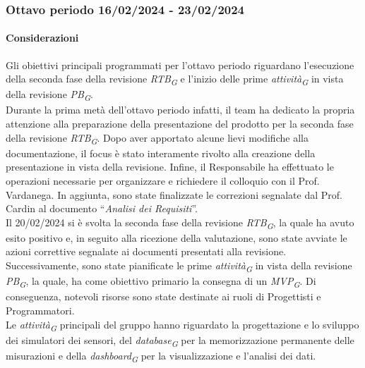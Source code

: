 
\subsubsection{Ottavo periodo  16/02/2024 - 23/02/2024}
\paragraph{Considerazioni}

Gli obiettivi principali programmati per l’ottavo periodo riguardano l’esecuzione della seconda fase della revisione \textit{RTB}\textsubscript{\textit{G}} e l’inizio delle prime \textit{attività}\textsubscript{\textit{G}} in vista della revisione \textit{PB}\textsubscript{\textit{G}}. \\
Durante la prima metà dell’ottavo periodo infatti, il team ha dedicato la propria attenzione alla preparazione della presentazione del prodotto per la seconda fase della revisione \textit{RTB}\textsubscript{\textit{G}}. Dopo aver apportato alcune lievi modifiche alla documentazione, il focus è stato interamente rivolto alla creazione della presentazione in vista della revisione. Infine, il Responsabile ha effettuato le operazioni necessarie per organizzare e richiedere il colloquio con il Prof. Vardanega. In aggiunta, sono state finalizzate le correzioni segnalate dal Prof. Cardin al documento “\textit{Analisi dei Requisiti}”. \\
Il 20/02/2024 si è svolta la seconda fase della revisione \textit{RTB}\textsubscript{\textit{G}}, la quale ha avuto esito positivo e, in seguito alla ricezione della valutazione, sono state avviate le azioni correttive segnalate ai documenti presentati alla revisione. \\
Successivamente, sono state pianificate le prime \textit{attività}\textsubscript{\textit{G}} in vista della revisione \textit{PB}\textsubscript{\textit{G}}, la quale, ha come obiettivo primario la consegna di un \textit{MVP}\textsubscript{\textit{G}}. Di conseguenza, notevoli risorse sono state destinate ai ruoli di Progettisti e Programmatori. \\
Le \textit{attività}\textsubscript{\textit{G}} principali del gruppo hanno riguardato la progettazione e lo sviluppo dei simulatori dei sensori, del \textit{database}\textsubscript{\textit{G}} per la memorizzazione permanente delle misurazioni e della \textit{dashboard}\textsubscript{\textit{G}} per la visualizzazione e l’analisi dei dati.
